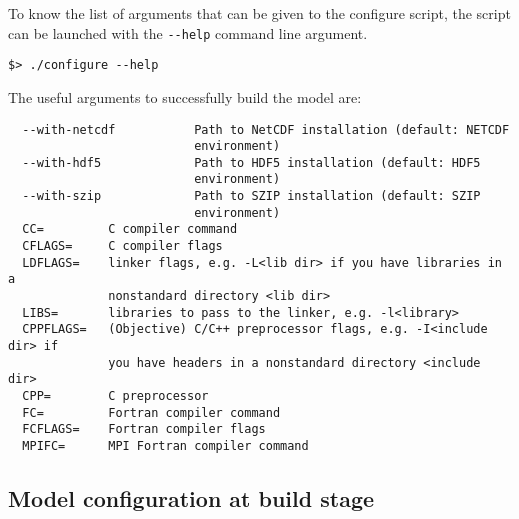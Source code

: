 To know the list of arguments that can be given to the configure script, the
script can be launched with the \verb=--help= command line argument.

\begin{Verbatim}
$> ./configure --help
\end{Verbatim}

The useful arguments to successfully build the model are:

\begin{Verbatim}
  --with-netcdf           Path to NetCDF installation (default: NETCDF
                          environment)
  --with-hdf5             Path to HDF5 installation (default: HDF5
                          environment)
  --with-szip             Path to SZIP installation (default: SZIP
                          environment)
  CC=         C compiler command
  CFLAGS=     C compiler flags
  LDFLAGS=    linker flags, e.g. -L<lib dir> if you have libraries in a
              nonstandard directory <lib dir>
  LIBS=       libraries to pass to the linker, e.g. -l<library>
  CPPFLAGS=   (Objective) C/C++ preprocessor flags, e.g. -I<include dir> if
              you have headers in a nonstandard directory <include dir>
  CPP=        C preprocessor
  FC=         Fortran compiler command
  FCFLAGS=    Fortran compiler flags
  MPIFC=      MPI Fortran compiler command
\end{Verbatim}

\subsection{Model configuration at build stage}
\label{modconf}

